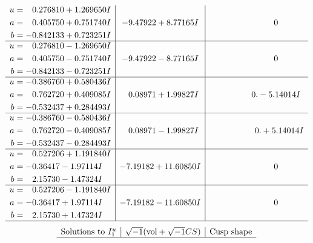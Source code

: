 \documentclass[1p]{elsarticle_modified}
\theoremstyle{definition}
\newcommand{\I}{\sqrt{-1}}
\begin{document}
$$\begin{array}{c|c|c}
\begin{aligned}
u &= \phantom{-}0.276810 + 1.269650 I \\
a &= \phantom{-}0.405750 + 0.751740 I \\
b &= -0.842133 + 0.723251 I\end{aligned}
 & -9.47922 + 8.77165 I & \phantom{-0.000000 } 0 \\ \hline\begin{aligned}
u &= \phantom{-}0.276810 - 1.269650 I \\
a &= \phantom{-}0.405750 - 0.751740 I \\
b &= -0.842133 - 0.723251 I\end{aligned}
 & -9.47922 - 8.77165 I & \phantom{-0.000000 } 0 \\ \hline\begin{aligned}
u &= -0.386760 + 0.580436 I \\
a &= \phantom{-}0.762720 + 0.409085 I \\
b &= -0.532437 + 0.284493 I\end{aligned}
 & \phantom{-}0.08971 + 1.99827 I & \phantom{-0.000000 } 0. - 5.14014 I \\ \hline\begin{aligned}
u &= -0.386760 - 0.580436 I \\
a &= \phantom{-}0.762720 - 0.409085 I \\
b &= -0.532437 - 0.284493 I\end{aligned}
 & \phantom{-}0.08971 - 1.99827 I & \phantom{-0.000000 -}0. + 5.14014 I \\ \hline\begin{aligned}
u &= \phantom{-}0.527206 + 1.191840 I \\
a &= -0.36417 - 1.97114 I \\
b &= \phantom{-}2.15730 - 1.47324 I\end{aligned}
 & -7.19182 + 11.60850 I & \phantom{-0.000000 } 0 \\ \hline\begin{aligned}
u &= \phantom{-}0.527206 - 1.191840 I \\
a &= -0.36417 + 1.97114 I \\
b &= \phantom{-}2.15730 + 1.47324 I\end{aligned}
 & -7.19182 - 11.60850 I & \phantom{-0.000000 } 0\\
 \hline 
 \end{array}$$\newpage$$\begin{array}{c|c|c}  
\text{Solutions to }I^u_{1}& \I (\text{vol} + \sqrt{-1}CS) & \text{Cusp shape}\\
 \hline 

\end{array}$$
\end{document}
